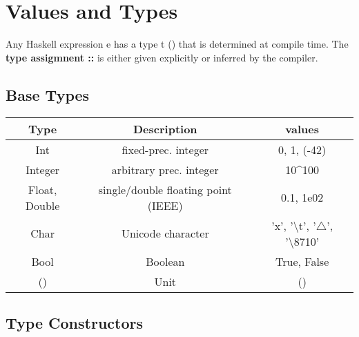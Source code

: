 

\chapter{Values and Types} %
\label{cha:values_and_types}

Any Haskell expression e has a type t () that is determined at compile time.
The \textbf{type assigmnent ::} is either given explicitly or inferred by the compiler.


\section{Base Types}

\vspace{9pt}\begin{center}\begin{tabular}{|c|c|c|}\hline
\rowcolor{grau}     Type            & Description                                   & values                                \\\hline
                    Int             & fixed-prec. integer                           & 0, 1, (-42)                           \\\hline
                    Integer         & arbitrary prec. integer                       & 10\textasciicircum 100                \\\hline
                    Float, Double   & single/double floating point (IEEE)           & 0.1, 1e02                             \\\hline
                    Char            & Unicode character                             & 'x', '\textbackslash t', 
                                                                                        '$\triangle$', '\textbackslash 8710'\\\hline
                    Bool            & Boolean                                       & True, False                           \\\hline
                    ()              & Unit                                          & ()                                    \\\hline
\end{tabular}\end{center}\vspace{9pt}


\section{Type Constructors}


